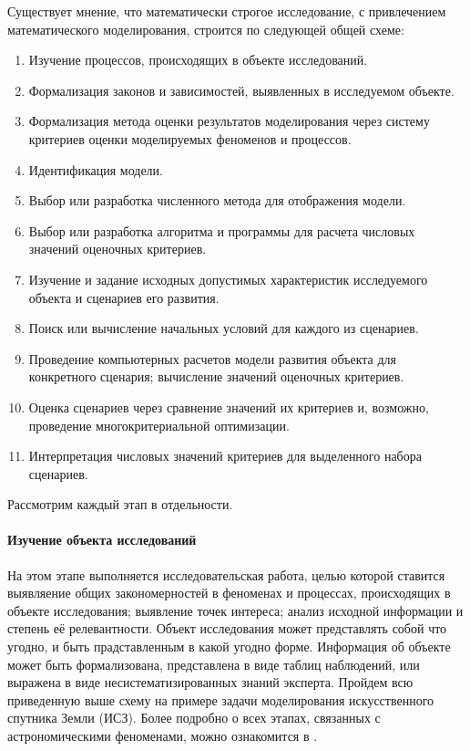 \documentclass[12pt, openany, twoside]{book} %
\begin{document}
Существует мнение, что математически строгое исследование, с привлечением математического моделирования, строится по следующей общей схеме:
\begin{enumerate}
\item Изучение процессов, происходящих в объекте исследований.
\item Формализация законов и зависимостей, выявленных в исследуемом объекте.
\item Формализация метода оценки результатов моделирования через систему критериев оценки моделируемых феноменов и процессов.
\item Идентификация модели.
\item Выбор или разработка численного метода для отображения модели.
\item Выбор или разработка алгоритма и программы для расчета числовых значений оценочных критериев.
\item Изучение и задание исходных допустимых характеристик исследуемого объекта и сценариев его развития.
\item Поиск или вычисление начальных условий для каждого из сценариев.
\item Проведение компьютерных расчетов модели развития объекта для конкретного сценария; вычисление значений оценочных критериев.
\item Оценка сценариев через сравнение значений их критериев и, возможно, проведение многокритериальной оптимизации.
\item Интерпретация числовых значений критериев для выделенного набора сценариев.
\end{enumerate}

Рассмотрим каждый этап в отдельности.

\paragraph{Изучение объекта исследований} На этом этапе выполняется исследовательская работа, целью которой ставится выявляение общих закономерностей в феноменах и процессах, происходящих в объекте исследования; выявление точек интереса; анализ исходной информации и степень её релевантности. Объект исследования может представлять собой что угодно, и быть прадставленным в какой угодно форме. Информация об объекте может быть формализована, представлена в виде таблиц наблюдений, или выражена в виде несистематизированных знаний эксперта. Пройдем всю приведенную выше схему на примере задачи моделирования искусственного спутника Земли (ИСЗ). Более подробно о всех этапах, связанных с астрономическими феноменами, можно ознакомится в \cite{avanta}.
\end{document}
